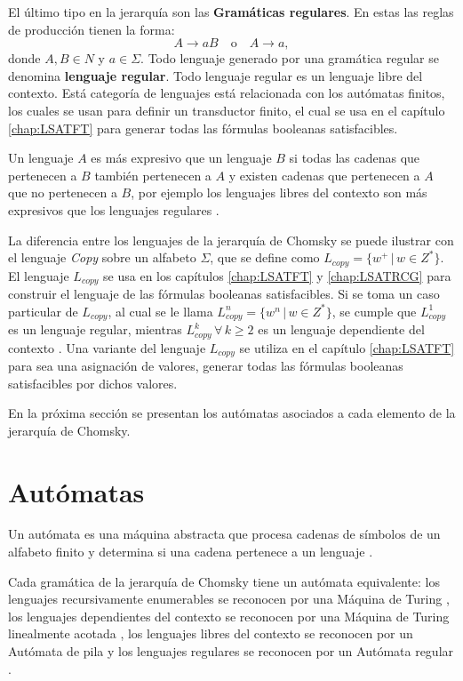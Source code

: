 El último tipo en la jerarquía son las \textbf{Gramáticas regulares}. En estas las reglas de producción tienen la forma:
\[
  A \to aB \quad \text{o} \quad A \to a,
\]
donde \(A, B \in N\) y \(a \in \Sigma\).
Todo lenguaje generado por una gramática regular se denomina \textbf{lenguaje regular}.
Todo lenguaje regular es un lenguaje libre del contexto. Está categoría de lenguajes está relacionada con los autómatas
finitos, los cuales se usan para definir un transductor finito, el cual se usa en el capítulo \ref{chap:LSATFT} para 
generar todas las fórmulas booleanas satisfacibles.

Un lenguaje $A$ es más expresivo que un lenguaje $B$ si todas las cadenas que pertenecen a $B$ también pertenecen a $A$ y existen cadenas 
que pertenecen a $A$ que no pertenecen a $B$, por ejemplo los lenguajes libres del contexto son más expresivos que los lenguajes regulares \cite{authomataTheory}. 

La diferencia entre los lenguajes de la jerarquía de Chomsky se puede ilustrar con el lenguaje \textit{Copy} sobre un alfabeto $\Sigma$, que se define como 
$L_{copy}=\{w^+\,|\,w\in Z^*\}$. El lenguaje $L_{copy}$ se usa en los  capítulos \ref{chap:LSATFT} y 
\ref{chap:LSATRCG} para construir el lenguaje de las fórmulas booleanas satisfacibles. 
Si se toma un caso particular de $L_{copy}$, al cual se le llama $L_{copy}^n=\{w^n\,|\,w\in Z^*\}$, se cumple que 
$L_{copy}^1$ es un lenguaje regular, mientras $L_{copy}^k\,\forall\,k\geq 2$ es un lenguaje dependiente del contexto \cite{authomataTheory}. 
Una variante del lenguaje $L_{copy}$ se utiliza en el capítulo \ref{chap:LSATFT} para
sea una asignación de valores, generar todas las fórmulas booleanas satisfacibles por dichos valores.

En la próxima sección se presentan los autómatas asociados a cada elemento de la jerarquía de Chomsky. 

\section{Autómatas}

Un autómata es una máquina abstracta que procesa cadenas de símbolos de un alfabeto finito y determina si una 
cadena pertenece a un lenguaje \cite{authomataTheory}.

Cada gramática de la jerarquía de Chomsky tiene un autómata equivalente: los lenguajes recursivamente enumerables 
se reconocen por una Máquina de Turing \cite{authomataTheory}, los lenguajes dependientes del contexto
se reconocen por una Máquina de Turing linealmente acotada \cite{authomataTheory}, los lenguajes libres del contexto 
se reconocen por un Autómata de pila \cite{authomataTheory} y  los lenguajes regulares se reconocen por un Autómata 
regular \cite{authomataTheory}.


